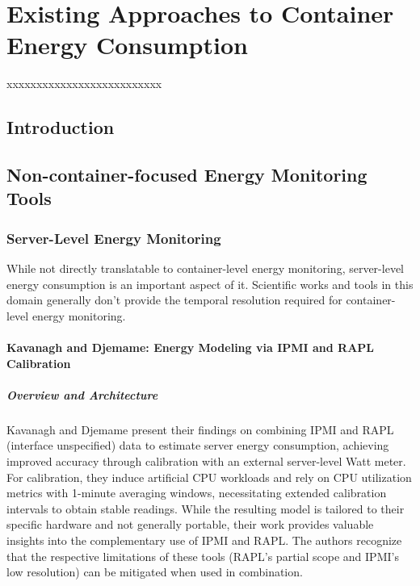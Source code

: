 \chapter{Existing Approaches to Container Energy Consumption}
\label{chap:tool-analysis}

xxxxxxxxxxxxxxxxxxxxxxxxxx

\section{Introduction}
\label{sec:tool-intro}

\section{Non-container-focused Energy Monitoring Tools}
\label{sec:non-k8s-tools}
\subsection{Server-Level Energy Monitoring}
\label{sec:server-tools}
While not directly translatable to container-level energy monitoring, server-level energy consumption is an important aspect of it. Scientific works and tools in this domain generally don't provide the temporal resolution required for container-level energy monitoring.

\subsubsection{Kavanagh and Djemame: Energy Modeling via IPMI and RAPL Calibration}
\label{sec:kavanagh}

\paragraph{Overview and Architecture}
Kavanagh and Djemame\parencite{kavanagh2019rapid} present their findings on combining IPMI and RAPL (interface unspecified) data to estimate server energy consumption, achieving improved accuracy through calibration with an external server-level Watt meter. For calibration, they induce artificial CPU workloads and rely on CPU utilization metrics with 1-minute averaging windows, necessitating extended calibration intervals to obtain stable readings. While the resulting model is tailored to their specific hardware and not generally portable, their work provides valuable insights into the complementary use of IPMI and RAPL. The authors recognize that the respective limitations of these tools (RAPL’s partial scope and IPMI’s low resolution) can be mitigated when used in combination.


